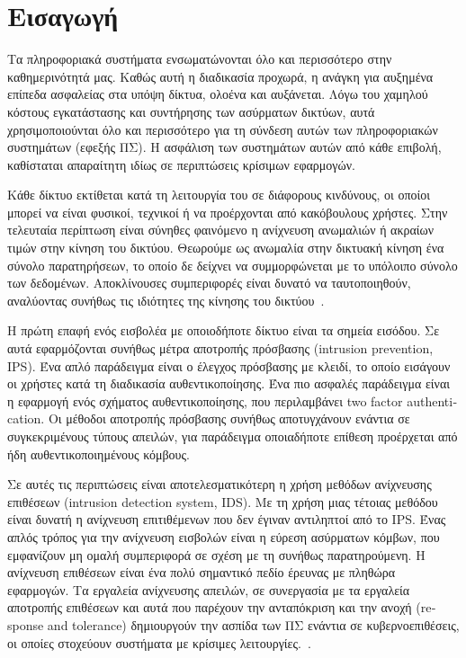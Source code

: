\documentclass[12pt]{report}
\begin{document}
\chapter{Εισαγωγή}
\hypersetup{pageanchor=true}
Τα πληροφοριακά συστήματα ενσωματώνονται όλο και περισσότερο στην καθημερινότητά μας. Καθώς αυτή η διαδικασία προχωρά, η ανάγκη για αυξημένα επίπεδα ασφαλείας στα υπόψη δίκτυα, ολοένα και αυξάνεται. Λόγω του χαμηλού κόστους εγκατάστασης και συντήρησης των ασύρματων δικτύων, αυτά χρησιμοποιούνται όλο και περισσότερο για τη σύνδεση αυτών των πληροφοριακών συστημάτων (εφεξής ΠΣ). Η ασφάλιση των συστημάτων αυτών από κάθε επιβολή, καθίσταται απαραίτητη ιδίως σε περιπτώσεις κρίσιμων εφαρμογών.

Κάθε δίκτυο εκτίθεται κατά τη λειτουργία του σε διάφορους κινδύνους, οι οποίοι μπορεί να είναι φυσικοί, τεχνικοί ή να προέρχονται από κακόβουλους χρήστες. Στην τελευταία περίπτωση είναι σύνηθες φαινόμενο η ανίχνευση ανωμαλιών ή ακραίων τιμών στην κίνηση του δικτύου. Θεωρούμε ως ανωμαλία στην δικτυακή κίνηση ένα σύνολο παρατηρήσεων, το οποίο δε δείχνει να συμμορφώνεται με το υπόλοιπο σύνολο των δεδομένων. Αποκλίνουσες συμπεριφορές είναι δυνατό να ταυτοποιηθούν, αναλύοντας συνήθως τις ιδιότητες της κίνησης του δικτύου~\cite{paper:05}.

Η πρώτη επαφή ενός εισβολέα με οποιοδήποτε δίκτυο είναι τα σημεία εισόδου. Σε αυτά εφαρμόζονται συνήθως μέτρα αποτροπής πρόσβασης (\textlatin{intrusion prevention, IPS}). Ένα απλό παράδειγμα είναι ο έλεγχος πρόσβασης με κλειδί, το οποίο εισάγουν οι χρήστες κατά τη διαδικασία αυθεντικοποίησης. Ένα πιο ασφαλές παράδειγμα είναι η εφαρμογή ενός σχήματος αυθεντικοποίησης, που περιλαμβάνει \textlatin{two factor authentication}. Οι μέθοδοι αποτροπής πρόσβασης συνήθως αποτυγχάνουν ενάντια σε συγκεκριμένους τύπους απειλών, για παράδειγμα οποιαδήποτε επίθεση προέρχεται από ήδη αυθεντικοποιημένους κόμβους.

Σε αυτές τις περιπτώσεις είναι αποτελεσματικότερη η χρήση μεθόδων ανίχνευσης επιθέσεων (\textlatin{intrusion detection system, IDS}). Με τη χρήση μιας τέτοιας μεθόδου είναι δυνατή η ανίχνευση επιτιθέμενων που δεν έγιναν αντιληπτοί από το \textlatin{IPS}. Ένας απλός τρόπος για την ανίχνευση εισβολών είναι η εύρεση ασύρματων κόμβων, που εμφανίζουν μη ομαλή συμπεριφορά σε σχέση με τη συνήθως παρατηρούμενη. Η ανίχνευση επιθέσεων είναι ένα πολύ σημαντικό πεδίο έρευνας με πληθώρα εφαρμογών. Τα εργαλεία ανίχνευσης απειλών, σε συνεργασία με τα εργαλεία αποτροπής επιθέσεων και αυτά που παρέχουν την ανταπόκριση και την ανοχή (\textlatin{response and tolerance}) δημιουργούν την ασπίδα των ΠΣ ενάντια σε κυβερνοεπιθέσεις, οι οποίες στοχεύουν συστήματα με κρίσιμες λειτουργίες.~\cite{paper:13}.
\end{document}
